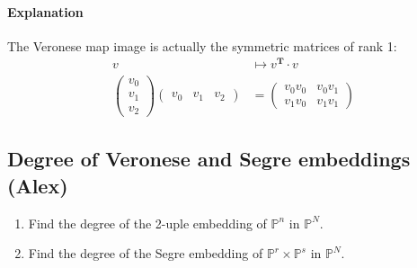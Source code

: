 \paragraph{Explanation} The Veronese map image is actually the symmetric matrices of rank 1:
\begin{align*}
	v&\longmapsto v^{\mathbf{T}}\cdot v\\
	\begin{pmatrix} v_0\\v_1\\v_2 \end{pmatrix} \begin{pmatrix} v_0&v_1&v_2 \end{pmatrix} & =\begin{pmatrix} v_0v_0&v_0v_1\\v_1v_0&v_1v_1 \end{pmatrix} 
\end{align*}

\subsection{Degree of Veronese and Segre embeddings (Alex)}

\begin{manualexercise}{7.1}\leavevmode 
	\begin{enumerate}[label=\alph*.]
		\item Find the degree of the 2-uple embedding of $\mathbb{P}^n$ in $\mathbb{P}^N$.

		\item Find the degree of the Segre embedding of $\mathbb{P}^r\times \mathbb{P}^s$ in $\mathbb{P}^N$.
	\end{enumerate}
\end{manualexercise}

